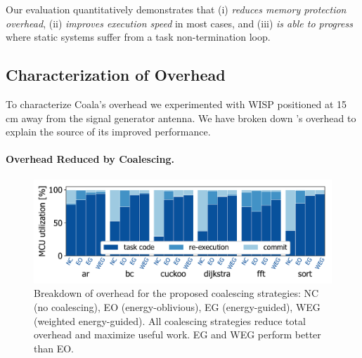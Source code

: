 %
Our evaluation quantitatively demonstrates that \sys (i) \emph{reduces memory
protection overhead}, (ii) \emph{improves execution speed} in most cases,
and (iii) \emph{is able to progress} where static systems suffer from a task non-termination loop. 
%
\subsection{Characterization of Overhead}
\label{sec:coala_overhead}

To characterize Coala's overhead we experimented with WISP positioned at
15\,cm away from the signal generator antenna.
We have broken down \sys's overhead to explain the source of its improved performance.

\paragraph{Overhead Reduced by Coalescing.}
\label{sec:overhead-coalescing}

\begin{figure}
    \centering
    \includegraphics[width=.8\columnwidth]{figures/coalEfficiency}
    \caption{Breakdown of overhead for the proposed coalescing strategies:
    NC (no coalescing), EO (energy-oblivious), EG (energy-guided), WEG
    (weighted energy-guided). All coalescing strategies reduce total
    overhead and maximize useful work. EG and WEG perform better than EO.}
    \label{fig:overallOverheadBreakdown}
\end{figure}

